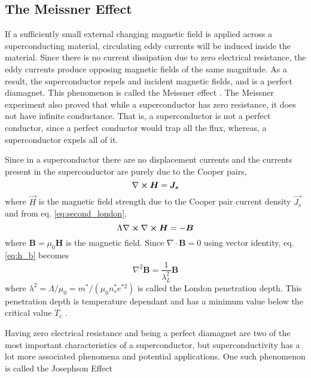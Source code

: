 \documentclass[letterpaper,english,reprint, aps]{revtex4-1}
\begin{document}
\subsection{The Meissner Effect}
If a sufficiently small external changing magnetic field is applied across a superconducting material, circulating eddy currents will be induced inside the material. Since there is no current dissipation due to zero electrical resistance, the eddy currents produce opposing magnetic fields of the same magnitude. As a result, the superconductor repels and incident magnetic fields, and is a perfect diamagnet. This phenomenon is called the Meissner effect \citep{feynman}. The Meissner experiment also proved that while a superconductor has zero resistance, it does not have infinite conductance. That is, a superconductor is not a perfect conductor, since a perfect conductor would trap all the flux, whereas, a superconductor expels all of it. 

Since in a superconductor there are no displacement currents and the currents present in the superconductor are purely due to the Cooper pairs,
\begin{equation}
    \nabla \cross \boldsymbol{H} = \boldsymbol{J_s}
\end{equation}
where $\Vec{H}$ is the magnetic field strength due to the Cooper pair current density $\Vec{J_s}$ and from eq. \ref{eq:second_london},
\begin{equation}
    \Lambda \nabla \cross \nabla \cross \boldsymbol{H} = - \boldsymbol{B} \label{eq:h_b}
\end{equation}
where $\boldsymbol{B} = \mu_0 \boldsymbol{H}$ is the magnetic field. Since $\nabla \cdot \boldsymbol{B} = 0$ using vector identity,  eq. \ref{eq:h_b} becomes
\begin{equation}
    \nabla^2 \boldsymbol{B} = \frac{1}{\lambda_L^2} \boldsymbol{B} 
\end{equation}
where $\lambda^2 = \Lambda/\mu_0 = m^*/(\mu_0n_s^* e^{*2})$ is called the London penetration depth. This penetration depth is temperature dependant and has a minimum value below the critical value $T_c$ \citep{feynman,vanduzer}. 

Having zero electrical resistance and being a perfect diamagnet are two of the most important characteristics of a superconductor, but superconductivity has a lot more associated phenomena and potential applications. One such phenomenon is called the Josephson Effect 
\end{document}
